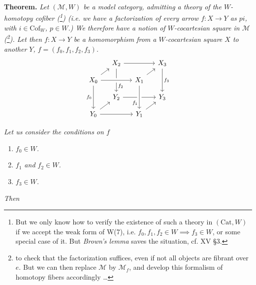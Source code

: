\documentclass[11pt]{article}
\newcommand{\printedpage}[1]{\marginpar{\footnotesize p.~#1}}
\newcommand{\Cof}{\mathrm{Cof}}
\begin{document}
\setcounter{footnote}{136}
\textbf{Theorem.} \textit{Let $(\mathcal{M}, W)$ be a model category, admitting a theory of the $W$-homotopy cofiber \textup{(}\footnote{But we only know how to verify the existence of such a theory in $(\mathrm{Cat}, W)$ if we accept the weak form of W(7), i.e. $f_0, f_1, f_2 \in W \implies f_3 \in W$, or some special case of it. But \textit{Brown's lemma} saves the situation, cf. XV \S3.}\textup{)} (i.e. we have a factorization of every arrow $f : X \longrightarrow Y$ as $pi$, with $i \in \Cof_W$, $p \in W$.) We therefore have a notion of $W$-cocartesian square in $\mathcal{M}$ \textup{(}\footnote{to check that the factorization suffices, even if not all objects are fibrant over $e$. But we can then replace $\mathcal{M}$ by $\mathcal{M}_f$, and develop this formalism of homotopy fibers accordingly \dots}\textup{)}. Let
\printedpage{177}
then $f : X \longrightarrow Y$ be a homomorphism from a $W$-cocartesian square $X$ to another $Y$, $f = (f_0, f_1, f_2, f_3)$.}
\[
\begin{tikzcd}[ampersand replacement=\&, column sep=small, row sep=small]
 \& X_2 \arrow[rr] \arrow[dd, "f_2" near end] \& \& X_3 \arrow[dd, "f_3"] \\
X_0 \arrow[ur] \arrow[rr, crossing over] \arrow[dd, "f_0"'] \& \& X_1 \arrow[ur] \& \\
 \& Y_2 \arrow[rr] \& \& Y_3 \\
Y_0 \arrow[ur] \arrow[rr] \& \& Y_1 \arrow[ur] \arrow[from=uu, crossing over, "f_1"' near end] \&
\end{tikzcd}
\]

\textit{Let us consider the conditions on $f$}

\begin{enumerate}
\item[\textit{a)}] \textit{$f_0 \in W$.}
\item[\textit{b)}] \textit{$f_1$ and $f_2 \in W$.}
\item[\textit{c)}] \textit{$f_3 \in W$.}
\end{enumerate}

\textit{Then}
\end{document}
